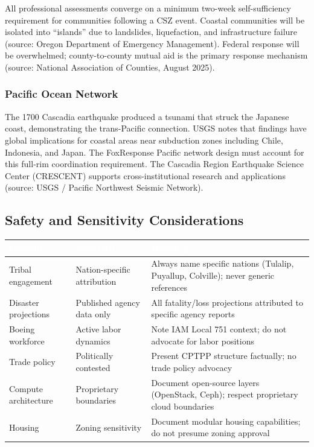 \documentclass[11pt,letterpaper]{article}
\newcommand{\tableheader}[1]{\textbf{\sffamily\textcolor{white}{#1}}}
\begin{document}
All professional assessments converge on a minimum two-week self-sufficiency requirement for communities following a CSZ event. Coastal communities will be isolated into ``islands'' due to landslides, liquefaction, and infrastructure failure (source: Oregon Department of Emergency Management). Federal response will be overwhelmed; county-to-county mutual aid is the primary response mechanism (source: National Association of Counties, August 2025).

\subsubsection{Pacific Ocean Network}

The 1700 Cascadia earthquake produced a tsunami that struck the Japanese coast, demonstrating the trans-Pacific connection. USGS notes that findings have global implications for coastal areas near subduction zones including Chile, Indonesia, and Japan. The FoxResponse Pacific network design must account for this full-rim coordination requirement. The Cascadia Region Earthquake Science Center (CRESCENT) supports cross-institutional research and applications (source: USGS / Pacific Northwest Seismic Network).

\subsection{Safety and Sensitivity Considerations}

\begin{center}
\begin{tabularx}{\textwidth}{L{3.5cm}L{3cm}X}
\toprule
{}
\tableheader{Domain} & \tableheader{Sensitivity} & \tableheader{Handling} \\
\midrule
Tribal engagement & Nation-specific attribution & Always name specific nations (Tulalip, Puyallup, Colville); never generic references \\
Disaster projections & Published agency data only & All fatality/loss projections attributed to specific agency reports \\
Boeing workforce & Active labor dynamics & Note IAM Local 751 context; do not advocate for labor positions \\
Trade policy & Politically contested & Present CPTPP structure factually; no trade policy advocacy \\
Compute architecture & Proprietary boundaries & Document open-source layers (OpenStack, Ceph); respect proprietary cloud boundaries \\
Housing & Zoning sensitivity & Document modular housing capabilities; do not presume zoning approval \\
\bottomrule
\end{tabularx}
\end{center}
\end{document}
